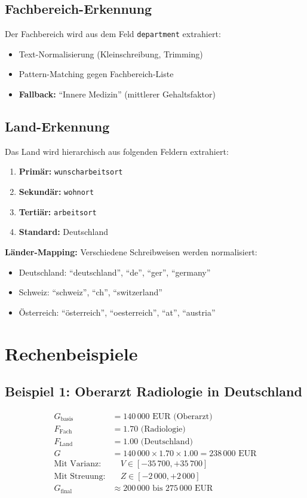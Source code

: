 \documentclass[12pt,a4paper]{article}
\begin{document}
\subsection{Fachbereich-Erkennung}

Der Fachbereich wird aus dem Feld \texttt{department} extrahiert:
\begin{itemize}
    \item Text-Normalisierung (Kleinschreibung, Trimming)
    \item Pattern-Matching gegen Fachbereich-Liste
    \item \textbf{Fallback:} ``Innere Medizin'' (mittlerer Gehaltsfaktor)
\end{itemize}

\subsection{Land-Erkennung}

Das Land wird hierarchisch aus folgenden Feldern extrahiert:
\begin{enumerate}
    \item \textbf{Primär:} \texttt{wunscharbeitsort}
    \item \textbf{Sekundär:} \texttt{wohnort}
    \item \textbf{Tertiär:} \texttt{arbeitsort}
    \item \textbf{Standard:} Deutschland
\end{enumerate}

\textbf{Länder-Mapping:} Verschiedene Schreibweisen werden normalisiert:
\begin{itemize}
    \item Deutschland: ``deutschland'', ``de'', ``ger'', ``germany''
    \item Schweiz: ``schweiz'', ``ch'', ``switzerland''
    \item Österreich: ``österreich'', ``oesterreich'', ``at'', ``austria''
\end{itemize}

\section{Rechenbeispiele}

\subsection{Beispiel 1: Oberarzt Radiologie in Deutschland}

\begin{align*}
    G_{\text{basis}} &= 140\,000 \text{ EUR (Oberarzt)} \\
    F_{\text{Fach}} &= 1.70 \text{ (Radiologie)} \\
    F_{\text{Land}} &= 1.00 \text{ (Deutschland)} \\
    G &= 140\,000 \times 1.70 \times 1.00 = 238\,000 \text{ EUR} \\
    \text{Mit Varianz:} &\quad V \in [-35\,700, +35\,700] \\
    \text{Mit Streuung:} &\quad Z \in [-2\,000, +2\,000] \\
    G_{\text{final}} &\approx 200\,000 \text{ bis } 275\,000 \text{ EUR}
\end{align*}
\end{document}

